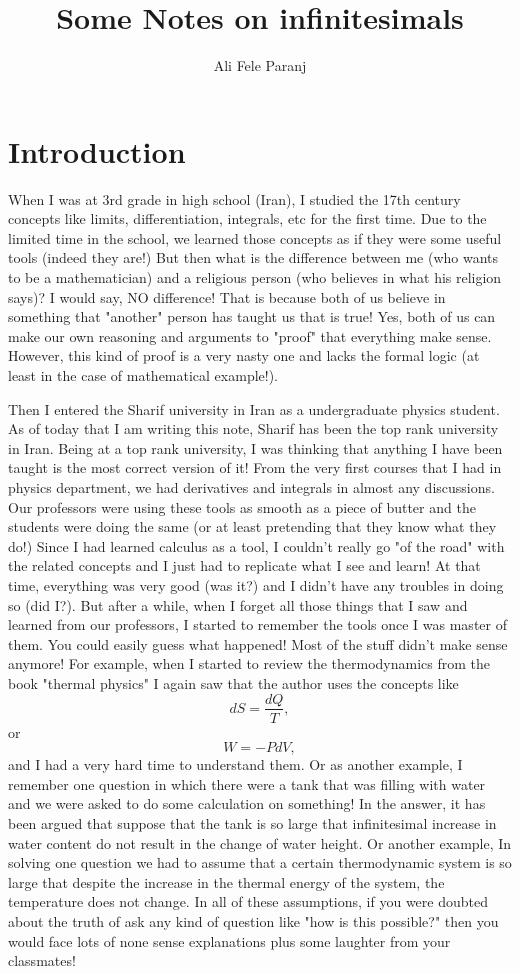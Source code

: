 \documentclass[11pt,a4paper]{article}
\title{{\Huge Some Notes on} {\tiny infinitesimals}}
\author{Ali Fele Paranj}
\begin{document}
	
\maketitle
\section{Introduction}

When I was at 3rd grade in high school (Iran), I studied the 17th century concepts like limits, differentiation, integrals, etc for the first time. Due to the limited time in the school, we learned those concepts as if they were some useful tools (indeed they are!) But then what is the difference between me (who wants to be a mathematician) and a religious person (who believes in what his religion says)? I would say, NO difference! That is because both of us believe in something that "another" person has taught us that is true! Yes, both of us can make our own reasoning and arguments to "proof" that everything make sense. However, this kind of proof is a very nasty one and lacks the formal logic (at least in the case of mathematical example!).

Then I entered the Sharif university in Iran as a undergraduate physics student. As of today that I am writing this note, Sharif has been the top rank university in Iran. Being at a top rank university, I was thinking that anything I have been taught is the most correct version of it! From the very first courses that I had in physics department, we had derivatives and integrals in almost any discussions. Our professors were using these tools as smooth as a piece of butter and the students were doing the same (or at least pretending that they know what they do!) Since I had learned calculus as a tool, I couldn't really go "of the road" with the related concepts and I just had to replicate what I see and learn! At that time, everything was very good (was it?) and I didn't have any troubles in doing so (did I?). But after a while, when I forget all those things that I saw and learned from our professors, I started to remember the tools once I was master of them. You could easily guess what happened! Most of the stuff didn't make sense anymore! For example, when I started to review the thermodynamics from the book "thermal physics" I again saw that the author uses the concepts like
\[ dS = \frac{dQ}{T}, \]
or 
\[ W = -P dV, \]
and I had a very hard time to understand them. Or as another example, I remember one question in which there were a tank that was filling with water and we were asked to do some calculation on something! In the answer, it has been argued that suppose that the tank is so large that infinitesimal increase in water content do not result in the change of water height. Or another example, In solving one question we had to assume that a certain thermodynamic system is so large that despite the increase in the thermal energy of the system, the temperature does not change. In all of these assumptions, if you were doubted about the truth of ask any kind of question like "how is this possible?" then you would face lots of none sense explanations plus some laughter from your classmates!
\end{document}
